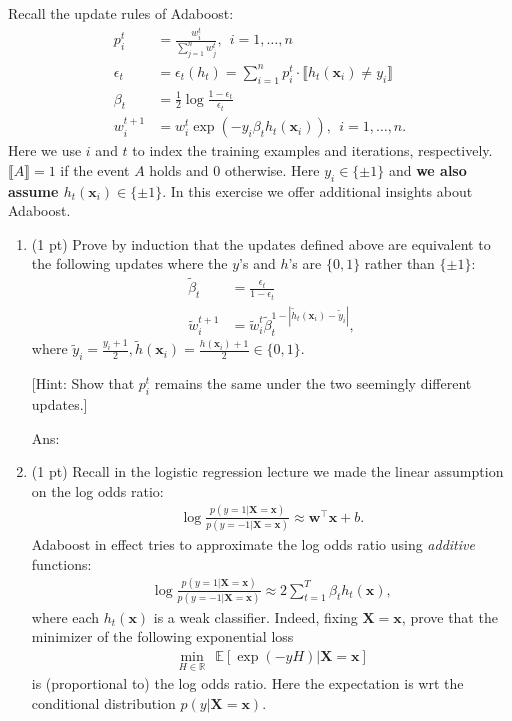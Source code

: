 \documentclass[10pt,letterpaper]{article}
\newcommand{\RR}{\mathds{R}}
\newcommand{\wv}{\mathbf{w}}
\newcommand{\xv}{\mathbf{x}}
\newcommand{\ans}[1]{{\color{orange}\textsf{Ans}: #1}}
\newcommand{\pred}[1]{\llbracket#1\rrbracket}
\newcommand{\Xv}{\mathbf{X}}
\newcommand{\EE}{\mathds{E}}
\begin{document}
\begin{exercise}

	Recall the update rules of Adaboost:
	\begin{align}
	p^t_i &= \frac{w^t_i}{\sum_{j=1}^n w^t_j},  ~~ i=1, \ldots, n \\
	\label{eq:eps} \epsilon_t &= \epsilon_t(h_t) = \sum_{i=1}^n p^t_i \cdot \pred{h_t(\xv_i) \ne y_i} \\
	\label{eq:beta}\beta_t &= \frac12\log\frac{1-\epsilon_t}{\epsilon_t} \\
	\label{eq:w} w^{t+1}_i&= w^t_i \exp(- y_i \beta_t h_t(\xv_i) ),  ~~ i=1, \ldots, n.
	\end{align}
	Here we use $i$ and $t$ to index the training examples and iterations, respectively. $\pred{A} = 1$ if the event $A$ holds and 0 otherwise. Here $y_i \in \{\pm 1\}$ and \textbf{we also assume $h_t(\xv_i) \in \{\pm 1\}$}.
	In this exercise we offer additional insights about Adaboost.

	\begin{enumerate}[label=\alph*)]
    \item (1 pt) Prove by induction that the updates defined above are equivalent to the following updates where the $y$'s and $h$'s are $\{0, 1\}$ rather than $\{\pm 1\}$:
		\begin{align}
		\tilde\beta_t &= \frac{\epsilon_t}{1-\epsilon_t} \\
		\tilde w^{t+1}_i & = \tilde w^t_i \tilde\beta_t^{1-|\tilde h_t(\xv_i) - \tilde y_i|},
		\end{align}
		where $\tilde y_i = \tfrac{y_i+1}{2}, \tilde h(\xv_i) = \tfrac{h(\xv_i)+1}{2} \in \{ 0,1\}$.

		[Hint: Show that $p_i^t$ remains the same under the two seemingly different updates.]

\ans{} 
		\item (1 pt) Recall in the logistic regression lecture we made the linear assumption on the log odds ratio:
		\begin{align}
		\log\frac{p(y=1 | \Xv = \xv)}{p(y=-1 | \Xv = \xv)} \approx \wv^\top \xv + b.
		\end{align}
		Adaboost in effect tries to approximate the log odds ratio using \emph{additive} functions:
		\begin{align}
		\log\frac{p(y=1 | \Xv = \xv)}{p(y=-1 | \Xv = \xv)} \approx 2\sum_{t=1}^T \beta_t h_t(\xv),
		\end{align}
		where each $h_t(\xv)$ is a weak classifier. Indeed, fixing $\Xv = \xv$, prove that the minimizer of the following exponential loss
		\begin{align}
		\label{eq:exp}
		\min_{H\in \RR} ~~ \EE[ \exp(- y H) | \Xv = \xv ]
		\end{align}
		is (proportional to) the log odds ratio. Here the expectation is wrt the conditional distribution $p(y | \Xv = \xv)$.


\end{enumerate}
\end{exercise}
\end{document}
